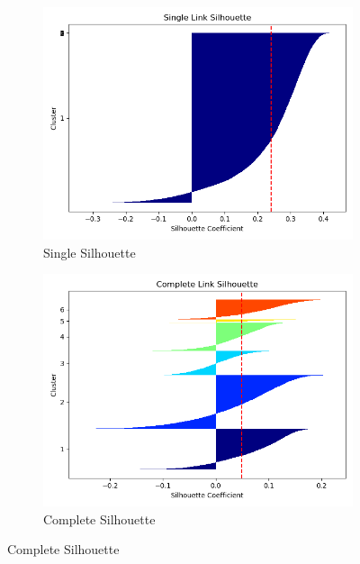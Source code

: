 \documentclass[12pt]{article}
\begin{document}
\begin{figure}
    \begin{subfigure}{.5\textwidth}
        \includegraphics[width=.95\textwidth]{../results/agglo/Silhouette_Plot_single.png}
        \caption{Single Silhouette}
        \end{subfigure}%
      \begin{subfigure}{.5\textwidth}
        \includegraphics[width=.95\textwidth]{../results/agglo/Silhouette_Plot_complete.png}
        \caption{Complete Silhouette}
      \end{subfigure}
      \label{figure7}
\end{figure}
\end{document}
